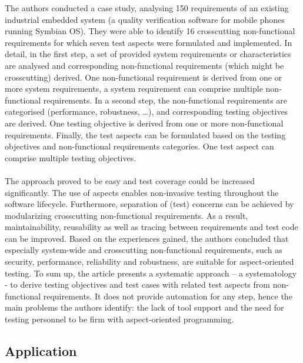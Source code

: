 The authors conducted a case study, analysing 150 requirements of an existing industrial embedded system (a quality verification software for mobile phones running Symbian OS). They were able to identify 16 crosscutting non-functional requirements for which seven test aspects were formulated and implemented. In detail, in the first step, a set of provided system requirements or characteristics are analysed and corresponding non-functional requirements (which might be crosscutting) derived. One non-functional requirement is derived from one or more system requirements, a system requirement can comprise multiple non-functional requirements. In a second step, the non-functional requirements are categorised (performance, robustness, …), and corresponding testing objectives are derived. One testing objective is derived from one or more non-functional requirements. Finally, the test aspects can be formulated based on the testing objectives and non-functional requirements categories. One test aspect can comprise multiple testing objectives.\\  
\\
The approach proved to be easy and test coverage could be increased significantly. The use of aspects enables non-invasive testing throughout the software lifecycle. Furthermore, separation of (test) concerns can be achieved by modularizing crosscutting non-functional requirements. As a result, maintainability, reusability as well as tracing between requirements and test code can be improved.  Based on the experiences gained, the authors concluded that especially system-wide and crosscutting non-functional requirements, such as security, performance, reliability and robustness, are suitable for aspect-oriented testing.
To sum up, the article presents a systematic approach – a systematology - to derive testing objectives and test cases with related test aspects from non-functional requirements. It does not provide automation for any step, hence the main problems the authors identify: the lack of tool support and the need for testing personnel to be firm with aspect-oriented programming.


\subsection{Application}

